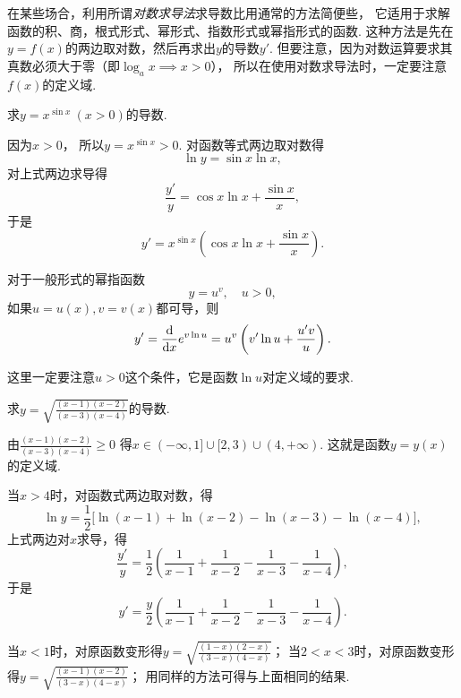 在某些场合，利用所谓\emph{对数求导法}求导数比用通常的方法简便些，
它适用于求解函数的积、商，根式形式、幂形式、指数形式或幂指形式的函数.
这种方法是先在\(y=f(x)\)的两边取对数，然后再求出\(y\)的导数\(y'\).
但要注意，因为对数运算要求其真数必须大于零（即\(\log_a x \implies x>0\)），
所以在使用对数求导法时，一定要注意\(f(x)\)的定义域.

\begin{example}
求\(y=x^{\sin x}\ (x>0)\)的导数.
\begin{solution}
因为\(x > 0\)，
所以\(y=x^{\sin x} > 0\).
对函数等式两边取对数得\[
	\ln y = \sin x \ln x,
\]
对上式两边求导得\[
	\frac{y'}{y} = \cos x \ln x + \frac{\sin x}{x},
\]
于是\[
	y' = x^{\sin x} \left( \cos x \ln x + \frac{\sin x}{x} \right).
\]
\end{solution}
\end{example}

\begin{theorem}
对于一般形式的幂指函数\[
	y = u^v, \quad u > 0,
\]
如果\(u=u(x),v=v(x)\)都可导，则\[
	y' = \dv{x}e^{v \ln u} = u^v \left( v' \ln u + \frac{u'v}{u} \right).
\]
\end{theorem}
这里一定要注意\(u>0\)这个条件，它是函数\(\ln u\)对定义域的要求.

\begin{example}
求\(y=\sqrt{\frac{(x-1)(x-2)}{(x-3)(x-4)}}\)的导数.
\begin{solution}
由\(\frac{(x-1)(x-2)}{(x-3)(x-4)}\geq0\)
得\(x \in (-\infty,1]\cup[2,3)\cup(4,+\infty)\).
这就是函数\(y=y(x)\)的定义域.

当\(x>4\)时，对函数式两边取对数，得\[
	\ln y = \frac{1}{2} \bigl[
		\ln(x-1)+\ln(x-2)-\ln(x-3)-\ln(x-4)
	\bigr],
\]
上式两边对\(x\)求导，得\[
	\frac{y'}{y} = \frac{1}{2} \left(
		\frac{1}{x-1} + \frac{1}{x-2} - \frac{1}{x-3} - \frac{1}{x-4}
	\right),
\]
于是\[
	y' = \frac{y}{2} \left(
		\frac{1}{x-1} + \frac{1}{x-2} - \frac{1}{x-3} - \frac{1}{x-4}
	\right).
\]

当\(x<1\)时，对原函数变形得\(y=\sqrt{\frac{(1-x)(2-x)}{(3-x)(4-x)}}\)；
当\(2<x<3\)时，对原函数变形得\(y=\sqrt{\frac{(x-1)(x-2)}{(3-x)(4-x)}}\)；
用同样的方法可得与上面相同的结果.
\end{solution}
\end{example}


